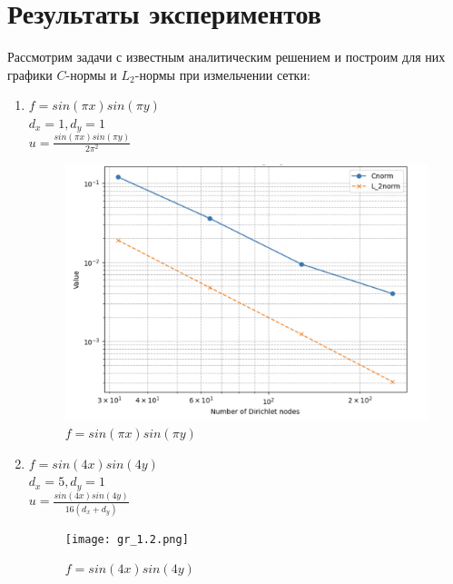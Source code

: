 \documentclass[12pt]{report}
\begin{document}
\section{Результаты экспериментов}
Рассмотрим задачи с известным аналитическим решением и построим для них графики $C$-нормы и $L_2$-нормы при измельчении сетки:
\begin{enumerate}
    \item $f = sin(\pi x)sin(\pi y)$\\
    $d_x = 1, d_y = 1$ \\
    $u = \frac{sin(\pi x)sin(\pi y)}{2\pi^2}$
    \begin{figure}[h]
        \begin{center}
        \includegraphics[scale=0.4]{gr_1.1.png}
        \caption{$f = sin(\pi x)sin(\pi y)$}
        \end{center}
    \end{figure}
    \newpage
    \item $f = sin(4 x)sin(4 y)$\\
    $d_x = 5, d_y = 1$ \\
    $u = \frac{sin(4x)sin(4y)}{16(d_x+d_y)}$
    \begin{figure}[h]
        \begin{center}
        \texttt{[image: gr\_1.2.png]}
        \caption{$f = sin(4x)sin(4y)$}
        \end{center}
    \end{figure}
\end{enumerate}
\end{document}
